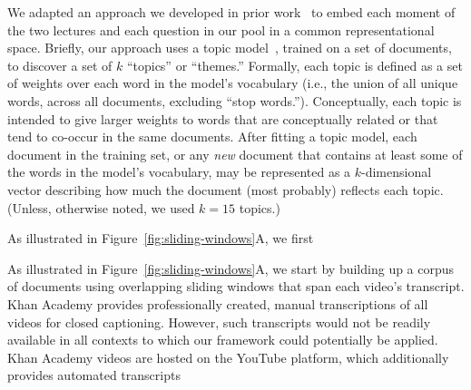 \documentclass[10pt]{article}
\newcommand{\questions}{S1}
\begin{document}
We adapted an approach we developed in prior work~\citep{HeusEtal21} to embed
each moment of the two lectures and each question in our pool in a common representational space.
Briefly, our approach uses a topic model~\citep[Latent Dirichlet Allocation;][]{BleiEtal03}, trained on a set
of documents, to discover a set of $k$ ``topics'' or ``themes.'' Formally, each
topic is defined as a set of weights over each word in the model's vocabulary
(i.e., the union of all unique words, across all documents, excluding ``stop
words.''). Conceptually, each topic is intended to give larger weights to words
that are conceptually related or that tend to co-occur in the same documents.
After fitting a topic model, each document in the training set, or any
\textit{new} document that contains at least some of the words in the model's
vocabulary, may be represented as a $k$-dimensional vector describing how much
the document (most probably) reflects each topic. (Unless, otherwise noted, we
used $k = 15$ topics.)

%
%

As illustrated in Figure~\ref{fig:sliding-windows}A, we first 


As illustrated in Figure~\ref{fig:sliding-windows}A, we start by building up a
corpus of documents using overlapping sliding windows that span each video's
transcript. Khan Academy provides professionally created, manual transcriptions of all videos for closed captioning. However, such transcripts would not be readily available in all contexts to which our framework could potentially be applied. Khan Academy videos are hosted on the YouTube platform, which additionally provides automated transcripts 
\end{document}
